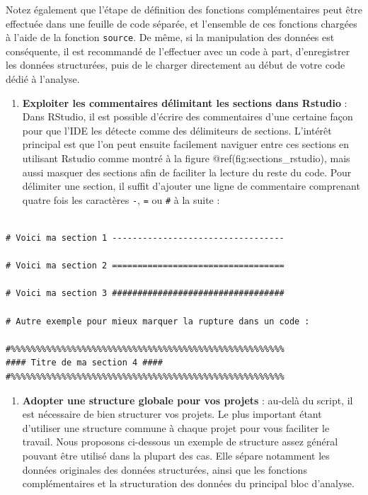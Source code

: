 \documentclass[
  11pt,
  french,
]{book}
\providecommand{\tightlist}{%
  \setlength{\itemsep}{0pt}\setlength{\parskip}{0pt}}
\begin{document}
Notez également que l'étape de définition des fonctions complémentaires peut être effectuée dans une feuille de code séparée, et l'ensemble de ces fonctions chargées à l'aide de la fonction \texttt{source}. De même, si la manipulation des données est conséquente, il est recommandé de l'effectuer avec un code à part, d'enregistrer les données structurées, puis de le charger directement au début de votre code dédié à l'analyse.

\begin{enumerate}
\def\labelenumi{\arabic{enumi}.}
\setcounter{enumi}{6}
\tightlist
\item
  \textbf{Exploiter les commentaires délimitant les sections dans Rstudio} : Dans RStudio, il est possible d'écrire des commentaires d'une certaine façon pour que l'IDE les détecte comme des délimiteurs de sections. L'intérêt principal est que l'on peut ensuite facilement naviguer entre ces sections en utilisant Rstudio comme montré à la figure @ref(fig:sections\_rstudio), mais aussi masquer des sections afin de faciliter la lecture du reste du code. Pour délimiter une section, il suffit d'ajouter une ligne de commentaire comprenant quatre fois les caractères \texttt{-}, \texttt{=} ou \texttt{\#} à la suite :
\end{enumerate}

\begin{verbatim}

# Voici ma section 1 ----------------------------------

# Voici ma section 2 ==================================

# Voici ma section 3 ##################################

# Autre exemple pour mieux marquer la rupture dans un code : 

#%%%%%%%%%%%%%%%%%%%%%%%%%%%%%%%%%%%%%%%%%%%%%%%%%%%%%%
#### Titre de ma section 4 ####
#%%%%%%%%%%%%%%%%%%%%%%%%%%%%%%%%%%%%%%%%%%%%%%%%%%%%%%
\end{verbatim}

\begin{enumerate}
\def\labelenumi{\arabic{enumi}.}
\setcounter{enumi}{7}
\tightlist
\item
  \textbf{Adopter une structure globale pour vos projets} : au-delà du script, il est nécessaire de bien structurer vos projets. Le plus important étant d'utiliser une structure commune à chaque projet pour vous faciliter le travail. Nous proposons ci-dessous un exemple de structure assez général pouvant être utilisé dans la plupart des cas. Elle sépare notamment les données originales des données structurées, ainsi que les fonctions complémentaires et la structuration des données du principal bloc d'analyse.
\end{enumerate}
\end{document}
